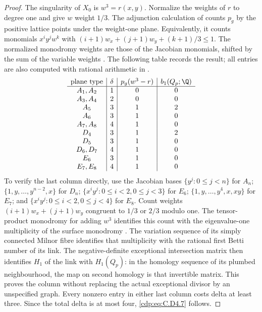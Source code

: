 \begin{proof}
The singularity of $X_0$ is $w^3=r(x,y)$. Normalize the
weights of $r$ to degree one and give $w$ weight $1/3$.
The adjunction calculation of
\cite[Theorem 2.1.1 and Corollary 2.1.3]{MerleTeissier1977}
counts $p_g$ by the positive lattice points under the
weight-one plane. Equivalently, it counts monomials
$x^iy^jw^k$ with
$(i+1)w_x+(j+1)w_y+(k+1)/3\le1$.
The normalized monodromy weights are those of the Jacobian
monomials, shifted by the sum of the variable weights
\cite[pp. 165--167]{Steenbrink1989Spectrum}.
The following table records the result; all entries are
also computed with rational arithmetic in
.
\[
\begin{array}{c|c|c|c}
 \hbox{plane type}&\delta&p_g(w^3-r)&b_1(Q_p;\Q)\\ \hline
 A_1,A_2&1&0&0\\
 A_3,A_4&2&0&0\\
 A_5&3&1&2\\
 A_6&3&1&0\\
 A_7,A_8&4&1&0\\
 D_4&3&1&2\\
 D_5&3&1&0\\
 D_6,D_7&4&1&0\\
 E_6&3&1&0\\
 E_7,E_8&4&1&0
\end{array}
\]
To verify the last column directly, use the Jacobian bases
$\{y^j:0\le j<n\}$ for $A_n$;
$\{1,y,\ldots,y^{n-2},x\}$ for $D_n$;
$\{x^iy^j:0\le i<2,0\le j<3\}$ for $E_6$;
$\{1,y,\ldots,y^4,x,xy\}$ for $E_7$; and
$\{x^iy^j:0\le i<2,0\le j<4\}$ for $E_8$.
Count weights $(i+1)w_x+(j+1)w_y$ congruent to $1/3$ or
$2/3$ modulo one. The tensor-product monodromy for adding
$w^3$ identifies this count with the eigenvalue-one
multiplicity of the surface monodromy
\cite[\S1 and Example 2.4(a)]{Nemethi1991Join}.
The variation sequence of its simply connected Milnor fibre
identifies that multiplicity with the rational first Betti
number of its link. The negative-definite exceptional
intersection matrix then identifies $H_1$ of the link with
$H_1(Q_p)$: in the homology sequence of its plumbed
neighbourhood, the map on second homology is that invertible
matrix. This proves the column without replacing the actual
exceptional divisor by an unspecified graph.
Every nonzero entry in either last column costs delta at
least three. Since the total delta is at most four,
\eqref{cdp:eq:C.D4.7} follows.


\end{proof}
